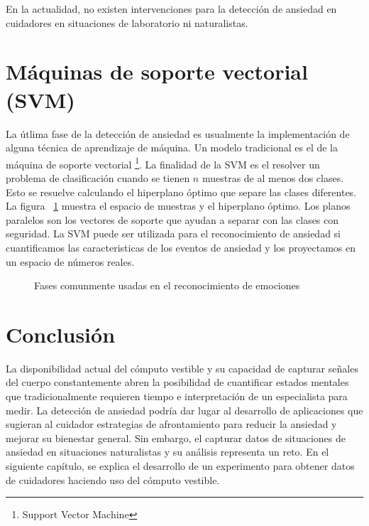 En la actualidad, no existen intervenciones para la detecci\'on de ansiedad en cuidadores en situaciones de laboratorio ni naturalistas.
\section{M\'aquinas de soporte vectorial (SVM)}
La \'utlima fase de la detecci\'on de ansiedad es usualmente la implementaci\'on de alguna t\'ecnica de aprendizaje de m\'aquina. Un modelo tradicional es el de la m\'aquina de soporte vectorial \footnote{Support Vector Machine}. La finalidad de la SVM es el resolver un problema de clasificaci\'on cuando se tienen $n$ muestras de al menos dos clases. Esto se resuelve calculando el hiperplano \'optimo que separe las clases diferentes. La figura ~\ref{fig:svm} muestra el espacio de muestras y el hiperplano \'optimo. Los planos paralelos son los vectores de soporte que ayudan a separar con las clases con seguridad. La SVM puede ser utilizada para el reconocimiento de ansiedad si cuantificamos las caracteristicas de los eventos de ansiedad y los proyectamos en un espacio de n\'umeros reales.
\begin{figure}[h]
	\centering
	\caption{Fases comunmente usadas en el reconocimiento de emociones} \label{fig:svm}
\end{figure}

\section{Conclusi\'on}\label{secc:conclution}
La disponibilidad actual del c\'omputo vestible y su capacidad de capturar se\~nales del cuerpo constantemente abren la posibilidad de cuantificar estados mentales que tradicionalmente requieren tiempo e interpretaci\'on de un especialista para medir. La detecci\'on de ansiedad podr\'ia dar lugar al desarrollo de aplicaciones que sugieran al cuidador estrategias de afrontamiento para reducir la ansiedad y mejorar su bienestar general. Sin embargo, el capturar datos de situaciones de ansiedad en situaciones naturalistas y su an\'alisis representa un reto. En el siguiente cap\'itulo, se explica el desarrollo de un experimento para obtener datos de cuidadores haciendo uso del c\'omputo vestible.
\newpage

